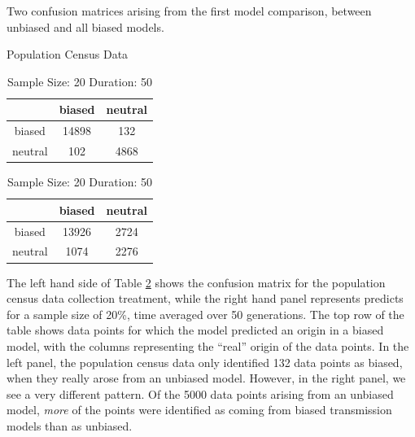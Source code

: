 \documentclass[10pt,letterpaper]{article}
\begin{document}
\begin{table}[!htb]
    \caption{Two confusion matrices arising from the first model comparison, between unbiased and all biased models.}
    \label{tab:confusion-matrix-comparison}	
    \begin{subtable}{.5\linewidth}
      \centering
        \caption{Population Census Data}
\begin{tabular}{|c|c|c|}
  \hline
 & biased & neutral \\ 
  \hline
biased & 14898 & 132 \\ 
  neutral & 102 & 4868 \\ 
   \hline
\end{tabular}
    \end{subtable}%
    \begin{subtable}{.5\linewidth}
      \centering
        \caption{Sample Size: 20  Duration:  50}
\begin{tabular}{|c|c|c|}
  \hline
 & biased & neutral \\ 
  \hline
biased & 13926 & 2724 \\ 
  neutral & 1074 & 2276 \\ 
   \hline
\end{tabular}
    \end{subtable} 
\end{table}

The left hand side of Table \ref{tab:confusion-matrix-comparison} shows the confusion matrix for the population census data collection treatment, while the right hand panel represents predicts for a sample size of 20\%, time averaged over 50 generations.  The top row of the table shows data points for which the model predicted an origin in a biased model, with the columns representing the ``real'' origin of the data points.  In the left panel, the population census data only identified 132 data points as biased, when they really arose from an unbiased model.  However, in the right panel, we see a very different pattern.  Of the 5000 data points arising from an unbiased model, \emph{more} of the points were identified as coming from biased transmission models than as unbiased.  
\end{document}
